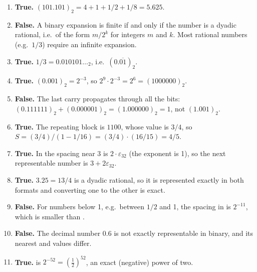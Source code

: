 \documentclass[a4paper]{article}
\begin{document}
\begin{enumerate}[itemsep=8pt]
    \item \textbf{True.}
        $(101.101)_2 = 4 + 1 + 1/2 + 1/8 = 5.625$.

    \item \textbf{False.}
        A binary expansion is finite if and only if the number is a
        dyadic rational, i.e.\ of the form $m/2^k$ for integers
        $m$ and $k$. Most rational numbers (e.g.\ $1/3$) require an
        infinite expansion.

    \item \textbf{True.}
        $1/3 = 0.010101\dotsc_2$, i.e.\ $(0.\overline{01})_2$.

    \item \textbf{True.}
        $(0.001)_2 = 2^{-3}$, so
        $2^9 \cdot 2^{-3} = 2^6 = (1000000)_2$.

    \item \textbf{False.}
        The last carry propagates through all the bits:
        $(0.111111)_2 + (0.000001)_2 = (1.000000)_2 = 1$, not
        $(1.001)_2$.

    \item \textbf{True.}
        The repeating block is $1100$, whose value is $3/4$, so
        $S = (3/4)/(1 - 1/16) = (3/4) \cdot (16/15) = 4/5$.

    \item \textbf{True.}
        In  the spacing near 3 is
        $2 \cdot \varepsilon_{32}$ (the exponent is 1), so the next
        representable number is $3 + 2\varepsilon_{32}$.

    \item \textbf{True.}
        $3.25 = 13/4$ is a dyadic rational, so it is represented exactly
        in both formats and converting one to the other is exact.

    \item \textbf{False.}
        For numbers below 1, e.g.\ between $1/2$ and 1, the spacing in
         is $2^{-11}$, which is smaller than
        .

    \item \textbf{False.}
        The decimal number $0.6$ is not exactly representable in binary,
        and its nearest  and  values differ.

    \item \textbf{True.}
         is $2^{-52} = \left(\frac{1}{2}\right)^{52}$,
        an exact (negative) power of two.


\end{enumerate}
\end{document}
